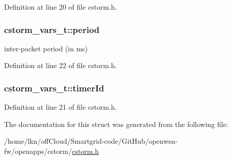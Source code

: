 Definition at line 20 of file cstorm.\+h.

\subsubsection[{\texorpdfstring{period}{period}}]{ cstorm\+\_\+vars\+\_\+t\+::period}\hypertarget{structcstorm__vars__t_a987c7fc2180adf20acbb33ff02924b39}{}\label{structcstorm__vars__t_a987c7fc2180adf20acbb33ff02924b39}


inter-\/packet period (in ms) 



Definition at line 22 of file cstorm.\+h.

\subsubsection[{\texorpdfstring{timer\+Id}{timerId}}]{ cstorm\+\_\+vars\+\_\+t\+::timer\+Id}\hypertarget{structcstorm__vars__t_a3c0653b7f890a8aa7728e3d7f044a51f}{}\label{structcstorm__vars__t_a3c0653b7f890a8aa7728e3d7f044a51f}


Definition at line 21 of file cstorm.\+h.



The documentation for this struct was generated from the following file\+:\begin{DoxyCompactItemize}
\item 
/home/lkn/off\+Cloud/\+Smartgrid-\/code/\+Git\+Hub/openwsn-\/fw/openapps/cstorm/\hyperlink{cstorm_8h}{cstorm.\+h}\end{DoxyCompactItemize}
